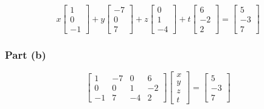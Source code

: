 \documentclass{report}
\begin{document}
\begin{equation}
x
\begin{bmatrix} 1 \\ 0 \\ -1 \end{bmatrix}
+
y
\begin{bmatrix} -7 \\ 0 \\ 7 \end{bmatrix}
+
z
\begin{bmatrix} 0 \\ 1 \\ -4 \end{bmatrix}
+
t
\begin{bmatrix} 6 \\ -2 \\ 2 \end{bmatrix}
=
\begin{bmatrix} 5 \\ -3 \\ 7 \end{bmatrix}
\end{equation}

\subsubsection*{Part (b)}
\begin{equation}
\begin{bmatrix}
1 & -7 & 0 & 6 \\ 
0 & 0 & 1 & -2 \\ 
-1 & 7 & -4 & 2 
\end{bmatrix}
\begin{bmatrix}
x \\ 
y \\ 
z \\
t
\end{bmatrix}
=
\begin{bmatrix} 
5 \\ 
-3 \\ 
7
\end{bmatrix}
\end{equation}
\end{document}
